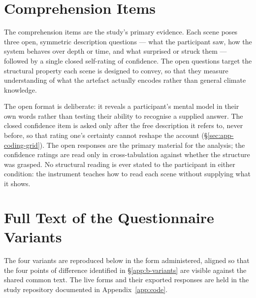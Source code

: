 \section{Comprehension Items}
\label{app:b-comprehension}

The comprehension items are the study's primary evidence. Each scene poses three open, symmetric description questions --- what the participant saw, how the system behaves over depth or time, and what surprised or struck them --- followed by a single closed self-rating of confidence. The open questions target the structural property each scene is designed to convey, so that they measure understanding of what the artefact actually encodes rather than general climate knowledge.

The open format is deliberate: it reveals a participant's mental model in their own words rather than testing their ability to recognise a supplied answer. The closed confidence item is asked only after the free description it refers to, never before, so that rating one's certainty cannot reshape the account (\S\ref{sec:app-coding-grid}). The open responses are the primary material for the analysis; the confidence ratings are read only in cross-tabulation against whether the structure was grasped. No structural reading is ever stated to the participant in either condition: the instrument teaches how to read each scene without supplying what it shows.

\section{Full Text of the Questionnaire Variants}
\label{app:b-fulltext}

The four variants are reproduced below in the form administered, aligned so that the four points of difference identified in \S\ref{app:b-variants} are visible against the shared common text. The live forms and their exported responses are held in the study repository documented in Appendix~\ref{app:code}.


